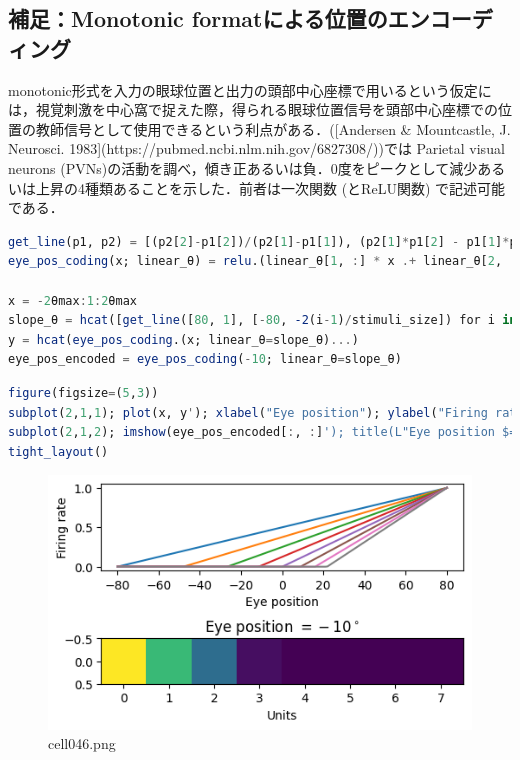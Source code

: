\subsection{補足：Monotonic formatによる位置のエンコーディング}
monotonic形式を入力の眼球位置と出力の頭部中心座標で用いるという仮定には，視覚刺激を中心窩で捉えた際，得られる眼球位置信号を頭部中心座標での位置の教師信号として使用できるという利点がある．([Andersen & Mountcastle, J. Neurosci. 1983](https://pubmed.ncbi.nlm.nih.gov/6827308/))では Parietal visual neurons (PVNs)の活動を調べ，傾き正あるいは負．0度をピークとして減少あるいは上昇の4種類あることを示した．前者は一次関数 (とReLU関数) で記述可能である．
\begin{lstlisting}[language=julia]
get_line(p1, p2) = [(p2[2]-p1[2])/(p2[1]-p1[1]), (p2[1]*p1[2] - p1[1]*p2[2])/(p2[1]-p1[1])] # [slope, intercept]
eye_pos_coding(x; linear_θ) = relu.(linear_θ[1, :] * x .+ linear_θ[2, :])

x = -2θmax:1:2θmax
slope_θ = hcat([get_line([80, 1], [-80, -2(i-1)/stimuli_size]) for i in 1:stimuli_size]...)
y = hcat(eye_pos_coding.(x; linear_θ=slope_θ)...)
eye_pos_encoded = eye_pos_coding(-10; linear_θ=slope_θ)
\end{lstlisting}
\begin{lstlisting}[language=julia]
figure(figsize=(5,3))
subplot(2,1,1); plot(x, y'); xlabel("Eye position"); ylabel("Firing rate")
subplot(2,1,2); imshow(eye_pos_encoded[:, :]'); title(L"Eye position $=-10^\circ$"); xlabel("Units") 
tight_layout()
\end{lstlisting}
\begin{figure}[ht]
	\centering
	\includegraphics[scale=0.8, max width=\linewidth]{./fig/solve-credit-assignment-problem/backpropagation/cell046.png}
	\caption{cell046.png}
	\label{cell046.png}
\end{figure}
